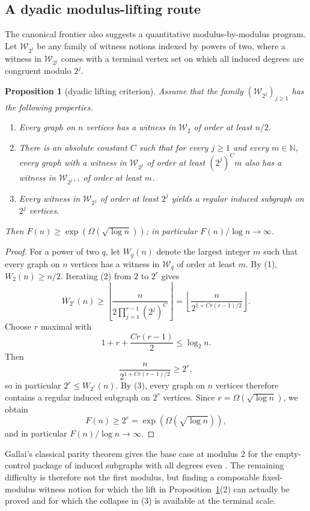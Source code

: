 \documentclass[11pt]{amsart}
\newtheorem{proposition}[theorem]{Proposition}
\theoremstyle{definition}
\newcommand{\N}{\mathbb{N}}
\begin{document}
\subsection*{A dyadic modulus-lifting route}

The canonical frontier also suggests a quantitative modulus-by-modulus program. Let
$\mathcal{W}_{2^j}$ be any family of witness notions indexed by powers of two, where a witness in
$\mathcal{W}_{2^j}$ comes with a terminal vertex set on which all induced degrees are congruent
modulo $2^j$.

\begin{proposition}[dyadic lifting criterion]\label{prop:dyadic-criterion}
Assume that the family $(\mathcal{W}_{2^j})_{j \ge 1}$ has the following properties.
\begin{enumerate}
  \item Every graph on $n$ vertices has a witness in $\mathcal{W}_2$ of order at least $n/2$.
  \item There is an absolute constant $C$ such that for every $j \ge 1$ and every $m \in \N$,
    every graph with a witness in $\mathcal{W}_{2^j}$ of order at least $(2^j)^C m$ also has a
    witness in $\mathcal{W}_{2^{j+1}}$ of order at least $m$.
  \item Every witness in $\mathcal{W}_{2^j}$ of order at least $2^j$ yields a regular induced
    subgraph on $2^j$ vertices.
\end{enumerate}
Then $F(n) \ge \exp(\Omega(\sqrt{\log n}))$; in particular $F(n)/\log n \to \infty$.
\end{proposition}

\begin{proof}
For a power of two $q$, let $W_q(n)$ denote the largest integer $m$ such that every graph on $n$
vertices has a witness in $\mathcal{W}_q$ of order at least $m$. By (1), $W_2(n) \ge n/2$.
Iterating (2) from $2$ to $2^r$ gives
\[
  W_{2^r}(n) \ge \left\lfloor \frac{n}{2 \prod_{j=1}^{r-1} (2^j)^C} \right\rfloor
  = \left\lfloor \frac{n}{2^{1 + C r(r-1)/2}} \right\rfloor.
\]
Choose $r$ maximal with
\[
  1 + r + \frac{C r(r-1)}{2} \le \log_2 n.
\]
Then
\[
  \frac{n}{2^{1 + C r(r-1)/2}} \ge 2^r,
\]
so in particular $2^r \le W_{2^r}(n)$. By (3), every graph on $n$ vertices therefore contains a
regular induced subgraph on $2^r$ vertices. Since $r = \Omega(\sqrt{\log n})$, we obtain
\[
  F(n) \ge 2^r = \exp(\Omega(\sqrt{\log n})),
\]
and in particular $F(n)/\log n \to \infty$.
\end{proof}

Gallai's classical parity theorem gives the base case at modulus $2$ for the empty-control package
of induced subgraphs with all degrees even \cite{Gallai}. The remaining difficulty is therefore not
the first modulus, but finding a composable fixed-modulus witness notion for which the lift in
Proposition~\ref{prop:dyadic-criterion}(2) can actually be proved and for which the collapse in
(3) is available at the terminal scale.
\end{document}
